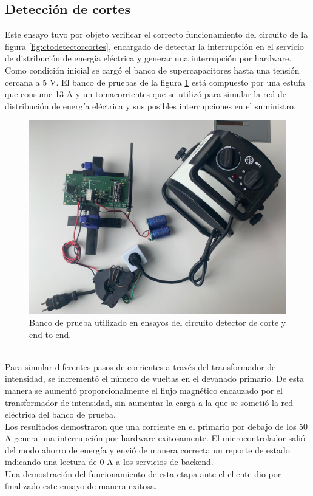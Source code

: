 \vspace{200px}
\subsection{Detecci\'{o}n de cortes}
Este ensayo tuvo por objeto verificar el correcto funcionamiento del circuito de la figura \ref{fig:ctodetectorcortes}, encargado de detectar la interrupci\'{o}n en el servicio de distribuci\'{o}n de energía el\'{e}ctrica y generar una interrupci\'{o}n por hardware.\\
Como condici\'{o}n inicial se carg\'{o} el banco de supercapacitores hasta una tensión cercana a 5 V. 
El banco de pruebas de la figura \ref{fig:bancopruebae2e2} est\'{a} compuesto por una estufa que consume 13 A y un tomacorrientes que se utiliz\'{o} para simular la red de distribuci\'{o}n de energía el\'{e}ctrica y sus posibles interrupciones en el suministro.\\
\begin{figure}[h]
	\centering
	\includegraphics[width=1.0\linewidth]{Figures/banco_prueba_e2e_1}
	\caption{Banco de prueba utilizado en ensayos del circuito detector de corte y end to end.}
	\label{fig:bancopruebae2e2}
\end{figure}\\
Para simular diferentes pasos de corrientes a trav\'{e}s del transformador de intensidad, se increment\'{o} el n\'{u}mero de vueltas en el devanado primario. De esta manera se aument\'{o} proporcionalmente el flujo magn\'{e}tico encauzado por el transformador de intensidad, sin aumentar la carga a la que se someti\'{o} la red el\'{e}ctrica del banco de prueba.\\
Los resultados demostraron que una corriente en el primario por debajo de los 50 A genera una interrupci\'{o}n por hardware exitosamente. El microcontrolador sali\'{o} del modo ahorro de energía y envi\'{o} de manera correcta un reporte de estado indicando una lectura de 0 A a los servicios de backend.\\
Una demostraci\'{o}n del funcionamiento de esta etapa ante el cliente dio por finalizado este ensayo de manera exitosa.\\


